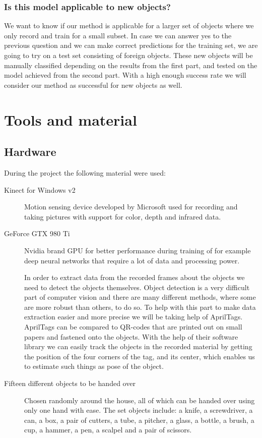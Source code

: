 \subsubsection*{Is this model applicable to new objects?}

We want to know if our method is applicable for a larger set of objects where we only record and train for a small subset. In case we can answer yes to the previous question and we can make correct predictions for the training set, we are going to try on a test set consisting of foreign objects. These new objects will be manually classified depending on the results from the first part, and tested on the model achieved from the second part. With a high enough success rate we will consider our method as successful for new objects as well.



\section{Tools and material}

\subsection*{Hardware}

During the project the following material were used:

\begin{description}
	\item[Kinect for Windows v2] Motion sensing device developed by Microsoft used for recording and taking pictures with support for color, depth and infrared data.

	\item[GeForce GTX 980 Ti] Nvidia brand GPU for better performance during training of for example deep neural networks that require a lot of data and processing power.

	\item[\textcite{AprilTags}] In order to extract data from the recorded frames about the objects we need to detect the objects themselves. Object detection is a very difficult part of computer vision and there are many different methods, where some are more robust than others, to do so. To help with this part to make data extraction easier and more precise we will be taking help of AprilTags. AprilTags can be compared to QR-codes that are printed out on small papers and fastened onto the objects. With the help of their software library we can easily track the objects in the recorded material by getting the position of the four corners of the tag, and its center, which enables us to estimate such things as pose of the object.

	\item[Fifteen different objects to be handed over] Chosen randomly around the house, all of which can be handed over using only one hand with ease. The set objects include: a knife, a screwdriver, a can, a box, a pair of cutters, a tube, a pitcher, a glass, a bottle, a brush, a cup, a hammer, a pen, a scalpel and a pair of scissors.

\end{description}

